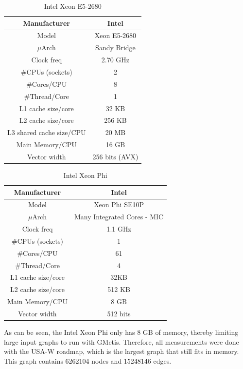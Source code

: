 \documentclass[abstract=on,9pt,twocolumn]{scrartcl}
\begin{document}
\begin{table}[H]
\centering
\footnotesize
\begin{tabular}{| c | c |}\hline
Manufacturer & Intel\\ \hline
Model & Xeon E5-2680\\ \hline
$\mu$Arch & Sandy Bridge\\ \hline
Clock freq & 2.70 GHz\\ \hline
\#CPUs (sockets) & 2 \\ \hline
\#Cores/CPU & 8\\ \hline
\#Thread/Core & 1\\ \hline
L1 cache size/core & 32 KB\\ \hline
L2 cache size/core & 256 KB\\ \hline
L3 shared cache size/CPU & 20 MB\\ \hline
Main Memory/CPU & 16 GB\\ \hline
Vector width & 256 bits (AVX)\\ \hline
\end{tabular}
\label{tab:host_stampede}
\caption{Intel Xeon E5-2680}
\end{table}

\begin{table}[H]
\centering
\footnotesize
\begin{tabular}{| c | c |}\hline
Manufacturer & Intel\\ \hline
Model & Xeon Phi SE10P\\ \hline
$\mu$Arch & Many Integrated Cores - MIC\\ \hline
Clock freq & 1.1 GHz\\ \hline
\#CPUs (sockets) & 1 \\ \hline
\#Cores/CPU & 61\\ \hline
\#Thread/Core & 4\\ \hline
L1 cache size/core & 32KB\\ \hline
L2 cache size/core & 512 KB\\ \hline
Main Memory/CPU & 8 GB\\ \hline
Vector width & 512 bits\\ \hline
\end{tabular}
\label{tab:mic}
\caption{Intel Xeon Phi}
\end{table}

As can be seen, the Intel Xeon Phi only has 8 GB of memory, thereby
limiting large input graphs to run with GMetis. Therefore, all
measurements were done with the USA-W roadmap, which is the largest graph
that still fits in memory. This graph contains 6262104 nodes and 15248146 edges.
\end{document}
